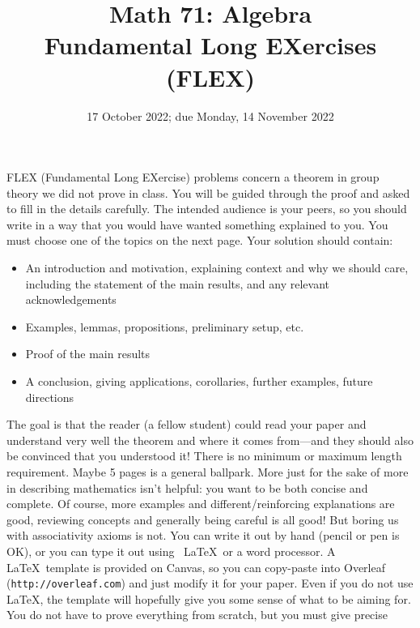 \documentclass[11pt, reqno]{amsart}
\newcounter{problem}
\begin{document}
\setlength{\headheight}{13.0pt}
\setlength{\footskip}{13.0pt}

\title{Math 71: Algebra \\ Fundamental Long EXercises (FLEX)}
\date{17 October 2022; due Monday, 14 November 2022}
\maketitle
FLEX (Fundamental Long EXercise) problems concern a theorem in group theory we did 
not prove in class.  You will be guided through the proof and asked to fill in the 
details carefully.  The intended audience is your peers, so you should write in a 
way that you would have wanted something explained to you.  You must choose one of 
the topics on the next page.  Your solution should contain:
\begin{itemize}
  \item An introduction and motivation, explaining context and why we should care, 
  including the statement of the main results, and any relevant acknowledgements 
  \item Examples, lemmas, propositions, preliminary setup, etc.
  \item Proof of the main results
  \item A conclusion, giving applications, corollaries, further examples, future 
  directions
\end{itemize}
The goal is that the reader (a fellow student) could read your paper and understand
very well the theorem and where it comes from---and they should also be convinced 
that you understood it!
There is no minimum or maximum length requirement.  Maybe 5 pages is a general 
ballpark.  More just for the sake of more in describing mathematics isn't helpful: 
you want to be both concise and complete.  Of course, more examples and 
different/reinforcing explanations are good, reviewing concepts and generally being
careful is all good!  But boring us with associativity axioms is not.  
You can write it out by hand (pencil or pen is OK), or you can type it out using \
LaTeX\ or a word processor.  A \LaTeX\ template is provided on Canvas, so you can 
copy-paste into Overleaf (\verb|http://overleaf.com|) and just modify it for your 
paper.  Even if you do not use \LaTeX, the template will hopefully give you some 
sense of what to be aiming for.  
You do not have to prove everything from scratch, but you must give precise 
\end{document}
